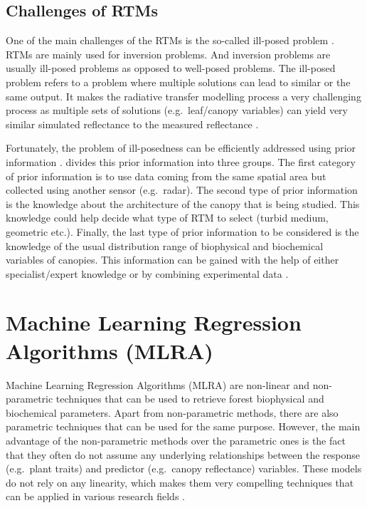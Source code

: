 \documentclass[a4paper, twoside]{templates/ociamthesis}
\begin{document}
\hypertarget{chrtm}{%
\section{Challenges of RTMs}\label{chrtm}}

One of the main challenges of the RTMs is the so-called ill-posed problem \citep{combal2003retrieval, zhu2019estimation}. RTMs are mainly used for inversion problems. And inversion problems are usually ill-posed problems as opposed to well-posed problems. The ill-posed problem refers to a problem where multiple solutions can lead to similar or the same output. It makes the radiative transfer modelling process a very challenging process as multiple sets of solutions (e.g.~leaf/canopy variables) can yield very similar simulated reflectance to the measured reflectance \citep{combal2003retrieval, darvishzadeh2008estimation, zhu2019estimation}.

Fortunately, the problem of ill-posedness can be efficiently addressed using prior information \citep{combal2003retrieval, darvishzadeh2008estimation, zhu2019estimation}. \citet{combal2003retrieval} divides this prior information into three groups. The first category of prior information is to use data coming from the same spatial area but collected using another sensor (e.g.~radar). The second type of prior information is the knowledge about the architecture of the canopy that is being studied. This knowledge could help decide what type of RTM to select (turbid medium, geometric etc.). Finally, the last type of prior information to be considered is the knowledge of the usual distribution range of biophysical and biochemical variables of canopies. This information can be gained with the help of either specialist/expert knowledge or by combining experimental data \citep{combal2003retrieval}.

\hypertarget{mlra}{%
\chapter{Machine Learning Regression Algorithms (MLRA)}\label{mlra}}

Machine Learning Regression Algorithms (MLRA) are non-linear and non-parametric techniques that can be used to retrieve forest biophysical and biochemical parameters. Apart from non-parametric methods, there are also parametric techniques that can be used for the same purpose. However, the main advantage of the non-parametric methods over the parametric ones is the fact that they often do not assume any underlying relationships between the response (e.g.~plant traits) and predictor (e.g.~canopy reflectance) variables. These models do not rely on any linearity, which makes them very compelling techniques that can be applied in various research fields \citep{sinha2020estimation, rivera2015emulator, verrelst2019quantifying}.
\end{document}
